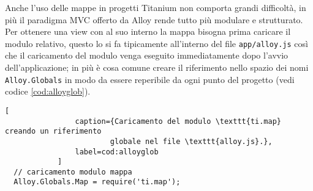             Anche l'uso delle mappe in progetti Titanium
            non comporta grandi difficoltà, in più il paradigma MVC
            offerto da Alloy rende tutto più modulare e strutturato. Per ottenere
            una view con al suo interno la mappa bisogna prima caricare il modulo
            relativo, questo lo si fa tipicamente all'interno del file
            \texttt{app/alloy.js} così che il caricamento del modulo venga
            eseguito immediatamente dopo l'avvio dell'applicazione; in più è cosa
            comune creare il riferimento nello spazio dei nomi \texttt{Alloy.Globals}
            in modo da essere reperibile da ogni punto del progetto (vedi codice \ref{cod:alloyglob}).
            \begin{lstlisting}[
                caption={Caricamento del modulo \texttt{ti.map} creando un riferimento
                        globale nel file \texttt{alloy.js}.},
                label=cod:alloyglob
            ]
  // caricamento modulo mappa
  Alloy.Globals.Map = require('ti.map');
            \end{lstlisting}

